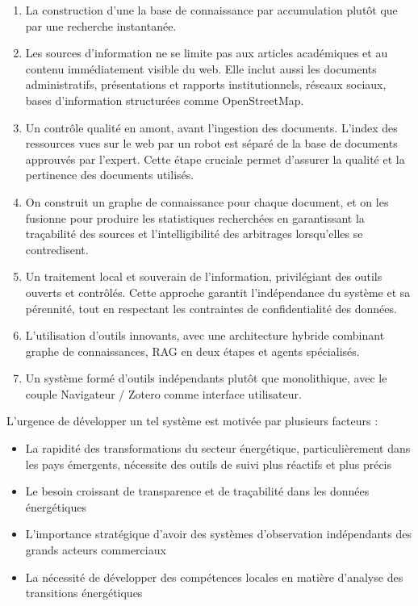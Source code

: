 \documentclass[a4paper,11pt]{report}
\providecommand{\tightlist}{\setlength{\itemsep}{0pt}\setlength{\parskip}{0pt}}
\begin{document}
\begin{enumerate}
\def\labelenumi{\arabic{enumi}.}
\tightlist
\item
  La construction d'une la base de connaissance par accumulation plutôt que par une recherche instantanée.
\item
  Les sources d'information ne se limite pas aux articles académiques et au contenu immédiatement visible du web. Elle inclut aussi les documents administratifs, présentations et rapports institutionnels, réseaux sociaux, bases d'information structurées comme OpenStreetMap.
\item
  Un contrôle qualité en amont, avant l'ingestion des documents. L'index des ressources vues sur le web par un robot est séparé de la base de documents approuvés par l'expert. Cette étape cruciale permet d'assurer la qualité et la pertinence des documents utilisés.
\item
  On construit un graphe de connaissance pour chaque document, et on les fusionne pour produire les statistiques recherchées en garantissant la traçabilité des sources et l'intelligibilité des arbitrages lorsqu'elles se contredisent.
\item
  Un traitement local et souverain de l'information, privilégiant des outils ouverts et contrôlés. Cette approche garantit l'indépendance du système et sa pérennité, tout en respectant les contraintes de confidentialité des données.
\item
  L'utilisation d'outils innovants, avec une architecture hybride combinant graphe de connaissances, RAG en deux étapes et agents spécialisés.
\item
  Un système formé d'outils indépendants plutôt que monolithique, avec le couple Navigateur / Zotero comme interface utilisateur.
\end{enumerate}

L'urgence de développer un tel système est motivée par plusieurs facteurs :

\begin{itemize}
\tightlist
\item
  La rapidité des transformations du secteur énergétique, particulièrement dans les pays émergents, nécessite des outils de suivi plus réactifs et plus précis
\item
  Le besoin croissant de transparence et de traçabilité dans les données énergétiques
\item
  L'importance stratégique d'avoir des systèmes d'observation indépendants des grands acteurs commerciaux
\item
  La nécessité de développer des compétences locales en matière d'analyse des transitions énergétiques
\end{itemize}
\end{document}
